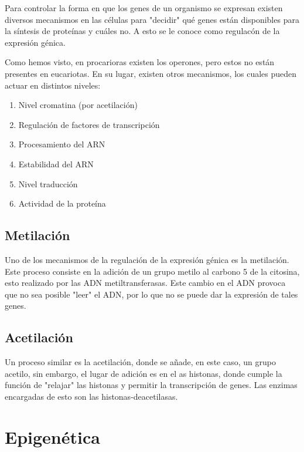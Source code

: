 Para controlar la forma en que los genes de un organismo se expresan existen diversos mecanismos en las células para "decidir" qué genes están disponibles para la síntesis de proteínas y cuáles no. A esto se le conoce como regulacón de la expresión génica.

Como hemos visto, en procarioras existen los operones, pero estos no están presentes en eucariotas. En su lugar, existen otros mecanismos, los cuales pueden actuar en distintos niveles:

\begin{enumerate}
    \item Nivel cromatina (por acetilación)
    \item Regulación de factores de transcripción
    \item Procesamiento del ARN
    \item Estabilidad del ARN
    \item Nivel traducción
    \item Actividad de la proteína
\end{enumerate}

\subsection{Metilación}

Uno de los mecanismos de la regulación de la expresión génica es la metilación. Este proceso consiste en la adición de un grupo metilo al carbono 5 de la citosina, esto realizado por las ADN metiltransferasas. Este cambio en el ADN  provoca  que no sea posible "leer" el ADN, por lo que no se puede dar la expresión de tales genes.

\subsection{Acetilación}\label{sec:acetilación}

Un proceso similar es la acetilación, donde se añade, en este caso, un grupo acetilo, sin embargo, el lugar de adición es en el as histonas, donde cumple la función de "relajar" las histonas y permitir la transcripción de genes. Las enzimas encargadas de esto son las histonas-deacetilasas.

\section{Epigenética}


